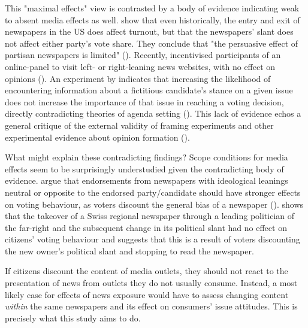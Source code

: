 \documentclass{article}
\begin{document}
This "maximal effects" view is contrasted by a body of evidence indicating weak to absent media effects as well. \citeauthor{Gentzkow2011} show that even historically, the entry and exit of newspapers in the US does affect turnout, but that the newspapers' slant does not affect either party's vote share. They conclude that "the persuasive effect of partisan newspapers is limited" (\citeyear[3011]{Gentzkow2011}). Recently, \citeauthor{Guess2021} incentivised participants of an online-panel to visit left- or right-leaning news websites, with no effect on opinions (\citeyear{Guess2021}). An experiment by \citeauthor{Lau2021} indicates that increasing the likelihood of encountering information about a fictitious candidate's stance on a given issue does not increase the importance of that issue in reaching a voting decision, directly contradicting theories of agenda setting (\citeyear{Lau2021}). This lack of evidence echos a general critique of the external validity of framing experiments and other experimental evidence about opinion formation (\cite{Barabas2010, Busby2019, Leeper2020}).

What might explain these contradicting findings? Scope conditions for media effects seem to be surprisingly understudied given the contradicting body of evidence. \citeauthor{Chiang2011a} argue that endorsements from newspapers with ideological leanings neutral or opposite to the endorsed party/candidate should have stronger effects on voting behaviour, as voters discount the general bias of a newspaper (\citeyear{Chiang2011a}). \citeauthor{Spirig2020} shows that the takeover of a Swiss regional newspaper through a leading politician of the far-right and the subsequent change in its political slant had no effect on citizens' voting behaviour and suggests that this is a result of voters discounting the new owner's political slant and stopping to read the newspaper.

If citizens discount the content of media outlets, they should not react to the presentation of news from outlets they do not usually consume. Instead, a most likely case for effects of news exposure would have to assess changing content \textit{within} the same newspapers and its effect on consumers' issue attitudes. This is precisely what this study aims to do.


\end{document}
